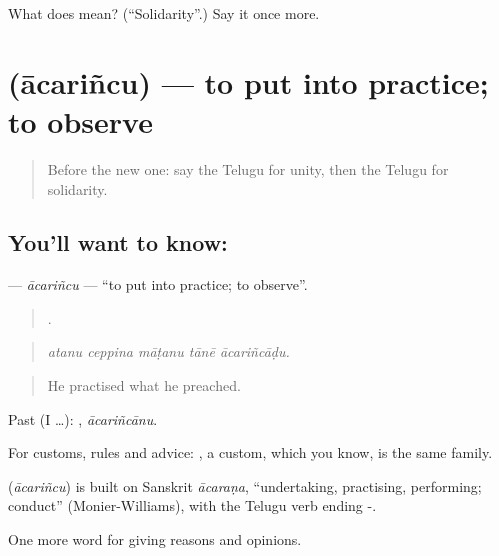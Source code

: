 \begin{tcolorbox}[breakable,colback=teal!4,colframe=teal!35!black,title={Before you move on}]
What does  mean? (\textquotedblleft{}Solidarity\textquotedblright{}.) Say it once more.
\end{tcolorbox}
\section[\texorpdfstring{\te{ఆచరించు} (ācariñcu)}{ఆచరించు (ācariñcu)}]{ (ācariñcu) — to put into practice; to observe}

\label{lesson:TE-C409-acarincu}



\begin{quote}
Before the new one: say the Telugu for unity, then the Telugu for solidarity.
\end{quote}

\subsection*{You'll want to know: }
\textbf{} — \emph{ācariñcu} — \textquotedblleft{}to put into practice; to observe\textquotedblright{}.

\begin{quote}
    .
\end{quote}

\begin{quote}
\emph{atanu ceppina māṭanu tānē ācariñcāḍu.}
\end{quote}

\begin{quote}
He practised what he preached.
\end{quote}

Past (I …): , \emph{ācariñcānu}.

For customs, rules and advice: , a custom, which you know, is the same family.

\begin{cousinweb}
\textbf{} (\emph{ācariñcu}) is built on Sanskrit \emph{ācaraṇa}, \textquotedblleft{}undertaking, practising, performing; conduct\textquotedblright{} (Monier-Williams), with the Telugu verb ending -.
\end{cousinweb}

\begin{grammarlens}[title={What you've built}]
One more word for giving reasons and opinions.
\end{grammarlens}

